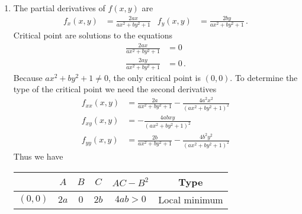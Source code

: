 \begin{solution}
\begin{enumerate}
\item
The partial derivatives of $f(x,y)$ are
\begin{align*}
f_x(x,y) &= \frac{2ax}{ax^2 + by^2 + 1} &
f_y(x,y) &= \frac{2by}{ax^2 + by^2 + 1} \,.
\end{align*}
Critical point are solutions to the equations
\begin{align*}
\frac{2ax}{ax^2 + by^2 + 1} &= 0 \\
\frac{2ay}{ax^2 + by^2 + 1} &= 0\,.
\end{align*}
Because $ax^2 + by^2 + 1 \neq 0$, the only critical point is $(0,0)$. To determine the type of the critical point we need the second derivatives
\begin{align*}
f_{xx}(x,y) &= \frac{2a}{ax^2 + by^2 + 1} - \frac{4a^2x^2}{\left(ax^2 + by^2 + 1\right)^2}\\
f_{xy}(x,y) &= - \frac{4abxy}{\left(ax^2 + by^2 + 1\right)^2}\\
f_{yy}(x,y) &= \frac{2b}{ax^2 + by^2 + 1} - \frac{4b^2y^2}{\left(ax^2 + by^2 + 1\right)^2}
\end{align*}
Thus we have
\begin{center}
\renewcommand{\arraystretch}{1.25}
\begin{tabular}{c|ccc|cc}
 & $A$ & $B$ & $C$ & $AC-B^2$ & Type \\ \hline
$\left(0, 0\right)$ & $2a$ & $0$ & $2b$ & $4ab > 0$ & Local minimum
\end{tabular}
\end{center}


\end{enumerate}
\end{solution}

